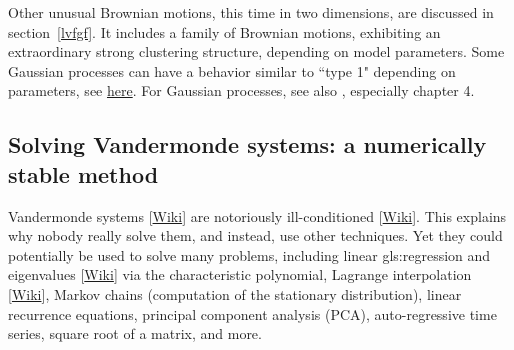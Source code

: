 \documentclass[oneside,10pt]{book}
\begin{document}
Other unusual Brownian motions, this time in two dimensions, are discussed in section~\ref{lvfgf}.  It includes a
family of Brownian motions, exhibiting an extraordinary strong clustering structure, depending on model parameters.  Some Gaussian processes
can have a behavior similar to ``type 1" depending on parameters, see \href{https://www.r-bloggers.com/2019/07/sampling-paths-from-a-gaussian-process/}{here}. For Gaussian processes, see also \cite{cras2006}, especially chapter 4.


\subsection{Solving Vandermonde systems: a numerically stable method}\label{vandervg}

\textcolor{index}{Vandermonde systems}  [\href{https://en.wikipedia.org/wiki/Vandermonde_matrix}{Wiki}] are notoriously
\textcolor{index}{ill-conditioned} [\href{https://en.wikipedia.org/wiki/Condition_number}{Wiki}]. This explains why nobody really solve them, and instead, use other techniques. Yet they could potentially be used to solve many problems,
including linear \gls{gls:regression} and \textcolor{index}{eigenvalues} [\href{https://en.wikipedia.org/wiki/Eigenvalues_and_eigenvectors}{Wiki}] via
 the characteristic polynomial, \textcolor{index}{Lagrange interpolation} [\href{https://en.wikipedia.org/wiki/Runge\%27s_phenomenon}{Wiki}], Markov chains (computation of the \textcolor{index}{stationary distribution}), linear recurrence equations, principal component analysis (PCA), auto-regressive time series, square root of a matrix, and more.
\end{document}
